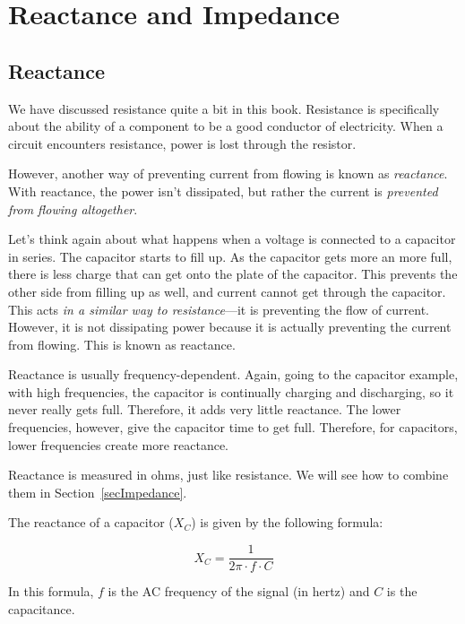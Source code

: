 \chapter{Reactance and Impedance}
\label{chapImpedance}

\section{Reactance}

We have discussed resistance quite a bit in this book.  
Resistance is specifically about the ability of a component to be a good conductor of electricity.
When a circuit encounters resistance, power is lost through the resistor.

However, another way of preventing current from flowing is known as \emph{reactance}.
With reactance, the power isn't dissipated, but rather the current is \emph{prevented from flowing altogether}.

Let's think again about what happens when a voltage is connected to a capacitor in series.
The capacitor starts to fill up.
As the capacitor gets more an more full, there is less charge that can get onto the plate of the capacitor.
This prevents the other side from filling up as well, and current cannot get through the capacitor.
This acts \emph{in a similar way to resistance}---it is preventing the flow of current.
However, it is not dissipating power because it is actually preventing the current from flowing.
This is known as reactance.

Reactance is usually frequency-dependent.
Again, going to the capacitor example, with high frequencies, the capacitor is continually charging and discharging, so it never really gets full.
Therefore, it adds very little reactance.
The lower frequencies, however, give the capacitor time to get full.
Therefore, for capacitors, lower frequencies create more reactance.

Reactance is measured in ohms, just like resistance.  
We will see how to combine them in Section~\ref{secImpedance}.

The reactance of a capacitor ($X_C$) is given by the following formula:

\begin{equation}
\label{eqCapReactance}
X_C = \frac{1}{2\pi\cdot f\cdot C}
\end{equation}

In this formula, $f$ is the AC frequency of the signal (in hertz) and $C$ is the capacitance.

